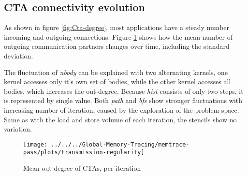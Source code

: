 \subsection{CTA connectivity evolution}
As shown in figure \ref{fig:Cta-degree}, most applications have a steady number incoming and outgoing connections. Figure \ref{philandering} shows how the mean number of outgoing communication partners changes over time, including the standard deviation. 

The fluctuation of \textit{nbody} can be explained with two alternating kernels, one kernel accesses only it's own set of bodies, while the other kernel accesses all bodies, which increases the out-degree. Because \textit{hist} consists of only two steps, it is represented by single value. Both \textit{path} and \textit{bfs} show stronger fluctuations with increasing number of iteration, caused by the exploration of the problem-space. Same as with the load and store volume of each iteration, the stencils show no variation.

\begin{figure}[h!]
	\centering
		\texttt{[image: ../../../Global-Memory-Tracing/memtrace-pass/plots/transmission-regularity]}
	\caption{Mean out-degree of CTAs, per iteration}
	\label{philandering}
\end{figure}